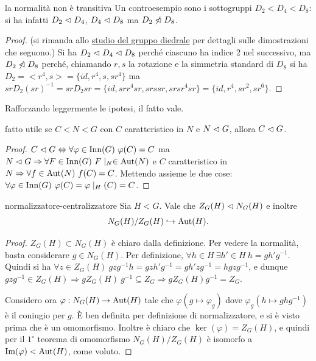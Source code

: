 \begin{proposition}{la normalità non è transitiva}
    Un controesempio sono i sottogruppi $D_2 < D_4 < D_8$: si ha infatti $D_2 \vartriangleleft D_4$, $D_4 \vartriangleleft D_8$ ma $D_2 \not \vartriangleleft D_8$.
\end{proposition}
\begin{proof}
    (si rimanda allo \hyperlink{diedrale}{studio del gruppo diedrale} per dettagli sulle dimostrazioni che seguono.) Si ha $D_2 \vartriangleleft D_4 \vartriangleleft D_8$ perché ciascuno ha indice 2 nel successivo, ma $D_2 \not \vartriangleleft D_8$ perché, chiamando $r,s$ la rotazione e la simmetria standard di $D_8$ si ha $D_2 = <r^4, s> = \{id, r^4, s, sr^4\}$ ma $srD_2(sr)^{-1} = srD_2sr = \{id, srr^4sr, srssr, srsr^4sr\} = \{id, r^4, sr^2, sr^6\}$. 
\end{proof}
Rafforzando leggermente le ipotesi, il fatto vale.
\begin{proposition}{fatto utile}
    se $C < N< G$ con $C$ caratteristico in $N$ e $N \vartriangleleft G$, allora $C \vartriangleleft G$.
\end{proposition}
\begin{proof}
    $C \vartriangleleft G \Leftrightarrow \forall \varphi \in \text{Inn}(G) \ \varphi(C) = C$ ma $N \tri G \Rightarrow \forall F \in \Inn(G) \ F\mid_N \in \Aut(N)$ e $C$ caratteristico in $N \Rightarrow \forall f \in \text{Aut}(N) \ f(C)= C$. Mettendo assieme le due cose: $ \forall \varphi \in \text{Inn}(G) \ \varphi(C)  = \varphi\mid_H(C) = C$. 
\end{proof}
\begin{lemma}{normalizzatore-centralizzatore}
    Sia $H < G$.  Vale che $Z_G(H) \vartriangleleft N_G(H)$ e inoltre
    \[
        N_G(H)/Z_G(H) \hookrightarrow \text{Aut}(H).
    \]
\end{lemma}
\begin{proof}
    $Z_G(H) \subset N_G(H)$ è chiaro dalla definizione. Per vedere la normalità, basta considerare $g \in N_G(H)$. Per definizione, $\forall h \in H \ \exists h' \in H \ h = gh'g^{-1}$.
    Quindi si ha $\forall z \in Z_G(H) \ gzg^{-1}h = gzh'g^{-1} = gh'zg^{-1} = hgzg^{-1}$,
    e dunque $gzg^{-1} \in Z_G(H) \Rightarrow gZ_G(H) \ g^{-1} \subseteq Z_G  \Rightarrow gZ_G(H)g^{-1} = Z_G$.
    
    Considero ora $\varphi: N_G(H) \rightarrow \text{Aut}(H)$ tale che $\varphi(g \mapsto \varphi_g)$ dove $\varphi_g(h \mapsto ghg^{-1})$ è il coniugio per $g$. È ben definita per definizione di normalizzatore, e si è visto prima che è un omomorfismo. Inoltre è chiaro che $\ker(\varphi) = Z_G(H)$, e quindi per il $1^{\circ}$ teorema di omomorfismo $N_G(H)/Z_G(H)$ è isomorfo a $\text{Im}(\varphi) < \text{Aut}(H)$, come voluto. 
\end{proof}

